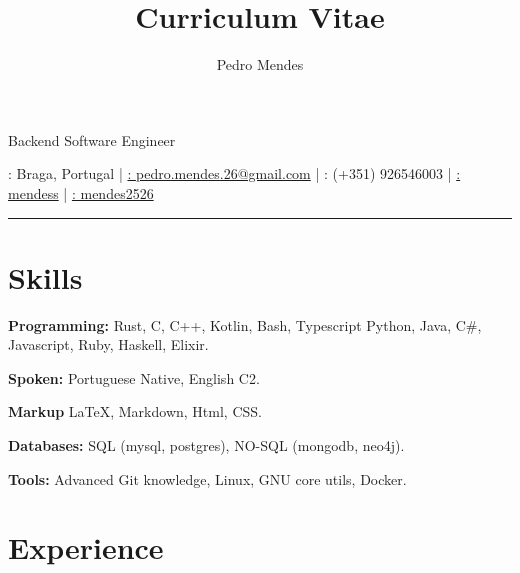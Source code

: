 \documentclass{article}
\makeatletter
\renewcommand{\maketitle}
{
    \begin{center}
        {\huge\bfseries\theauthor}

        \vspace{.25em}

        \Large{Backend Software Engineer}

        \vspace{.25em}

        \large{\thetitle}

        \vspace{.25em}

        \faMapMarker: Braga, Portugal |
        \href{mailto:pedro.mendes.26@gmail.com}{\faEnvelope: pedro.mendes.26@gmail.com} |
        \faPhone: (+351) 926546003 |
        \href{https://github.com/mendess}{\faGithub: mendess} |
        \href{https://www.linkedin.com/in/mendes2526/}{\faLinkedinSquare: mendes2526}

    \end{center}
}
\makeatother
\begin{document}
\title{Curriculum Vitae}
\author{Pedro Mendes}

\maketitle

\hrule

\section{Skills}

\begin{multicols}{2}

    \textbf{Programming:} Rust, C, C++, Kotlin, Bash, Typescript Python, Java, C\#,
    Javascript, Ruby, Haskell, Elixir.

    \textbf{Spoken:} Portuguese Native, English C2.

    \textbf{Markup} \LaTeX, Markdown, Html, CSS\@.

    \textbf{Databases:} SQL (mysql, postgres), NO-SQL (mongodb, neo4j).

    \textbf{Tools:} Advanced Git knowledge, Linux, GNU core utils, Docker.

\end{multicols}

\section{Experience}
\end{document}
